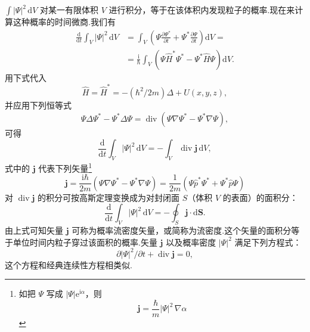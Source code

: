 $\int|\varPsi|^2\,\mathrm{d}V$ 对某一有限体积 $V$ 进行积分，等于在该体积内发现粒子的概率.现在来计算这种概率的时间微商.我们有
\begin{equation*}
\begin{aligned}
  \frac{\mathrm{d}}{\mathrm{d}t}\int_V|\varPsi|^2\,\mathrm{d}V
  &=\int_V\left(\varPsi\frac{\partial\varPsi^*}{\partial t}
  +\varPsi^*\frac{\partial\varPsi}{\partial t}\right)\mathrm{d}V=\\
  &=\frac{\mathrm{i}}{\hbar}\int_V\left(\varPsi\hat{H}^*\varPsi^*
  -\varPsi^*\hat{H}\varPsi\right)\mathrm{d}V.
\end{aligned}
\end{equation*}
用下式代入
\begin{equation*}
  \hat{H}=\hat{H}^*=-\left(\hbar^2/2m\right)\Delta+U(x,y,z),
\end{equation*}
并应用下列恒等式
\begin{equation*}
  \varPsi\Delta\varPsi^*-\varPsi^*\Delta\varPsi
  =\operatorname{div}\left(\varPsi\nabla\varPsi^*-\varPsi^*\nabla\varPsi\right),
\end{equation*}
可得
\begin{equation*}
  \frac{\mathrm{d}}{\mathrm{d}t}\int_V|\varPsi|^2\,\mathrm{d}V
  =-\int_V\operatorname{div}\boldsymbol{j}\,\mathrm{d}V,
\end{equation*}
式中的 $\boldsymbol{j}$ 代表下列矢量\footnote{如把 $\varPsi$ 写成 $|\varPsi|\mathrm{e}^{\mathrm{i}\alpha}$，则
\begin{equation*}
  \boldsymbol{j}=\frac{\hbar}{m}|\varPsi|^2\,\nabla\alpha
  \tag{19.4a}
\end{equation*}}
\begin{equation}
  \boldsymbol{j}=\frac{\mathrm{i}\hbar}{2m}
  \left(\varPsi\nabla\varPsi^*-\varPsi^*\nabla\varPsi\right)
  =\frac{1}{2m}\left(\varPsi\hat{p}^*\varPsi^*+\varPsi^*\hat{p}\varPsi\right)
\end{equation}
对 $\operatorname{div}\boldsymbol{j}$ 的积分可按高斯定理变换成为对封闭面 $S$（体积 $V$ 的表面）的面积分：
\begin{equation}
  \frac{\mathrm{d}}{\mathrm{d}t}\int_V|\varPsi|^2\,\mathrm{d}V
  =-\oint_S\boldsymbol{j}\cdot\mathrm{d}\boldsymbol{S}.
\end{equation}
由上式可知矢量 $\boldsymbol{j}$ 可称为概率流密度矢量，或简称为流密度.这个矢量的面积分等于单位时间内粒子穿过该面积的概率.矢量 $\boldsymbol{j}$ 以及概率密度 $|\varPsi|^2$ 满足下列方程式：
\begin{equation}
  \partial|\varPsi|^2/\partial t+\operatorname{div}\boldsymbol{j}=0,
\end{equation}
这个方程和经典连续性方程相类似.

